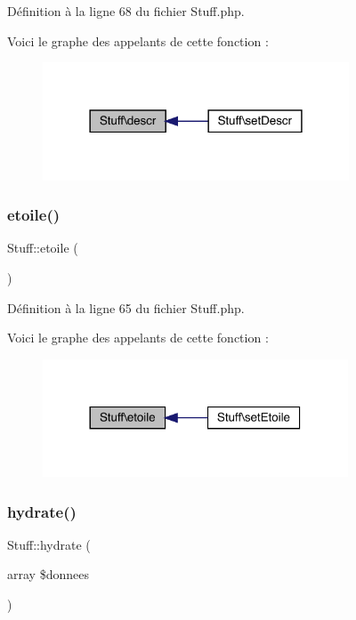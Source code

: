 Définition à la ligne 68 du fichier Stuff.\+php.

Voici le graphe des appelants de cette fonction \+:\nopagebreak
\begin{figure}[H]
\begin{center}
\leavevmode
\includegraphics[width=258pt]{class_stuff_a1b91ba84e3eb06abc49dc61810f97454_icgraph}
\end{center}
\end{figure}
\mbox{\label{class_stuff_a60e42cc89da2a51716a685ad1cbe8b44}} 
\subsubsection{\texorpdfstring{etoile()}{etoile()}}
{\footnotesize\ttfamily Stuff\+::etoile (\begin{DoxyParamCaption}{ }\end{DoxyParamCaption})}



Définition à la ligne 65 du fichier Stuff.\+php.

Voici le graphe des appelants de cette fonction \+:\nopagebreak
\begin{figure}[H]
\begin{center}
\leavevmode
\includegraphics[width=257pt]{class_stuff_a60e42cc89da2a51716a685ad1cbe8b44_icgraph}
\end{center}
\end{figure}
\mbox{\label{class_stuff_af51c6e71896e65dd76820cd733b5f274}} 
\subsubsection{\texorpdfstring{hydrate()}{hydrate()}}
{\footnotesize\ttfamily Stuff\+::hydrate (\begin{DoxyParamCaption}\item[{array}]{\$donnees }\end{DoxyParamCaption})}



